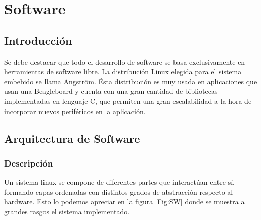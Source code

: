 \chapter{Software}

\section{Introducción}
Se debe destacar que todo el desarrollo de software se basa exclusivamente en herramientas de software libre. La distribución Linux elegida para el sistema embebido se llama Angström. Ésta distribución es muy usada en aplicaciones que usan una Beagleboard y cuenta con una gran cantidad de bibliotecas implementadas en lenguaje C, que permiten una gran escalabilidad a la hora de incorporar nuevos periféricos en la aplicación.

\section{Arquitectura de Software}
\subsection{Descripción}
Un sistema linux se compone de diferentes partes que interactúan entre sí, formando capas ordenadas con distintos grados de abstracción respecto al hardware. Esto lo podemos apreciar en la figura \ref{Fig:SW} donde se muestra a grandes rasgos el sistema implementado. 


